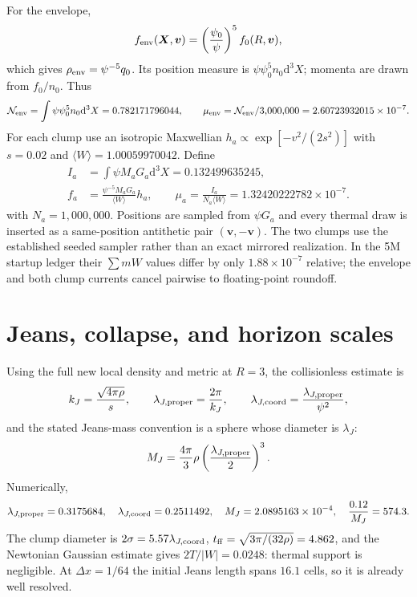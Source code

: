 \documentclass[11pt]{article}
\newcommand{\dd}{\mathrm{d}}
\begin{document}
For the envelope,
\begin{equation}
 f_{\rm env}(\bm X,\bm v)=\left(\frac{\psi_0}{\psi}\right)^5f_0(R,\bm v),
\end{equation}
which gives $\rho_{\rm env}=\psi^{-5}q_0$.  Its position measure is
$\psi\psi_0^5n_0\dd^3X$; momenta are drawn from $f_0/n_0$.  Thus
\begin{equation}
 {\cal N}_{\rm env}=\int\psi\psi_0^5n_0\dd^3X=0.782171796044,\qquad
 \mu_{\rm env}={\cal N}_{\rm env}/3{,}000{,}000
 =2.60723932015\times10^{-7}.
\end{equation}
For each clump use an isotropic Maxwellian $h_a\propto\exp[-v^2/(2s^2)]$ with
$s=0.02$ and $\langle W\rangle=1.00059970042$.  Define
\begin{equation}
 \begin{aligned}
 I_a&=\int\psi M_aG_a\dd^3X=0.132499635245,\\
 f_a&=\frac{\psi^{-5}M_aG_a}{\langle W\rangle}h_a,\qquad
 \mu_a=\frac{I_a}{N_a\langle W\rangle}=1.32420222782\times10^{-7}.
 \end{aligned}
\end{equation}
with $N_a=1{,}000{,}000$.  Positions are sampled from $\psi G_a$ and every thermal
draw is inserted as a same-position antithetic pair $(\bm v,-\bm v)$.  The two clumps
use the established seeded sampler rather than an exact mirrored realization.  In the
5M startup ledger their $\sum mW$ values differ by only $1.88\times10^{-7}$ relative;
the envelope and both clump currents cancel pairwise to floating-point roundoff.

\section{Jeans, collapse, and horizon scales}

Using the full new local density and metric at $R=3$, the collisionless estimate is
\begin{equation}
 k_J=\frac{\sqrt{4\pi\rho}}s,\qquad
 \lambda_{J,{\rm proper}}=\frac{2\pi}{k_J},\qquad
 \lambda_{J,{\rm coord}}=\frac{\lambda_{J,{\rm proper}}}{\psi^2},
\end{equation}
and the stated Jeans-mass convention is a sphere whose diameter is $\lambda_J$:
\begin{equation}
 M_J=\frac{4\pi}{3}\rho\left(\frac{\lambda_{J,{\rm proper}}}{2}\right)^3.
\end{equation}
Numerically,
\begin{equation}
 \lambda_{J,{\rm proper}}=0.3175684,\quad
 \lambda_{J,{\rm coord}}=0.2511492,\quad
 M_J=2.0895163\times10^{-4},\quad
 \frac{0.12}{M_J}=574.3.
\end{equation}
The clump diameter is $2\sigma=5.57\lambda_{J,{\rm coord}}$,
$t_{\rm ff}=\sqrt{3\pi/(32\rho)}=4.862$, and the Newtonian Gaussian estimate gives
$2T/|W|=0.0248$: thermal support is negligible.  At $\Delta x=1/64$ the initial
Jeans length spans $16.1$ cells, so it is already well resolved.
\end{document}

